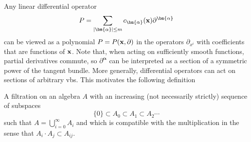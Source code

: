 Any linear differential operator 
\[P=\sum_{|\bm{\alpha}|\leq m}c_{\bm{\alpha}}(\bf{x})\partial^{\bm{\alpha}}\]
can be viewed as a polynomial $P=P(\bf{x},\partial)$ in the operators $\partial_{x^i}$ with coefficients that are functions of $\bf{x}$. Note that, when acting on sufficiently smooth functions, partial derivatives commute, so $\partial^{\bm{\alpha}}$ can be interpreted as a section of a symmetric power of the tangent bundle. More generally, differential operators can act on sections of arbitrary \glspl{vb}. This motivates the following definition 

\begin{defn}
    A filtration on an algebra $A$ with an increasing (not necessarily strictly) sequence of subspaces 
    \[\{0\}\subset A_0\subset A_1\subset A_2\cdots \]
    such that $A=\bigcup_{i=0}^\infty A_i$ and which is compatible with the multiplication in the sense that $A_i\cdot A_j\subset A_{ij}$.
\end{defn}

